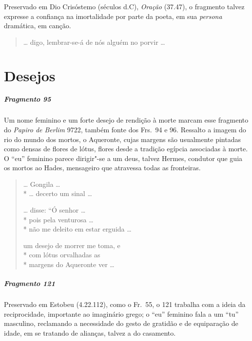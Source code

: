 {\small Preservado em Dio Crisóstemo (séculos  d.C), \textit{Oração} (37.47), o fragmento talvez expresse a confiança na imortalidade por parte da poeta, em sua \textit{persona} dramática, em canção.}

\begin{verse}
\ldots{} digo, lembrar-se-á de nós alguém no porvir \ldots{}
\end{verse}

\chapter{Desejos}

\paragraph{Fragmento 95}

{\small Um nome feminino e um forte desejo de rendição à morte marcam esse fragmento do
\textit{Papiro de Berlim }9722, também fonte dos Frs.~94 e 96. Ressalto a imagem do
rio do mundo dos mortos, o Aqueronte, cujas margens são usualmente pintadas
como densas de flores de lótus, flores desde a tradição egípcia associadas à morte. O “eu” feminino parece dirigir"-se a um deus,
talvez Hermes, condutor que guia os mortos ao Hades, mensageiro que atravessa todas as fronteiras.}

\begin{verse}
\ldots{} Gongila \ldots{}\\*
\ldots{} decerto um sinal \ldots{}

\ldots{} disse: “Ó senhor \ldots{}\\*
pois pela venturosa \ldots{}\\*
não me deleito em estar erguida \ldots{}

um desejo de morrer me toma, e\\*
com lótus orvalhadas as\\*
margens do Aqueronte ver \ldots{}
\end{verse}


\paragraph{Fragmento 121}

{\small Preservado em Estobeu (4.22.112), como o Fr.~55, o 121 trabalha com a ideia da
reciprocidade, importante ao imaginário grego; o “eu” feminino fala a um “tu”
masculino, reclamando a necessidade do gesto de gratidão e de equiparação de
idade, em se tratando de alianças, talvez a do casamento.}



